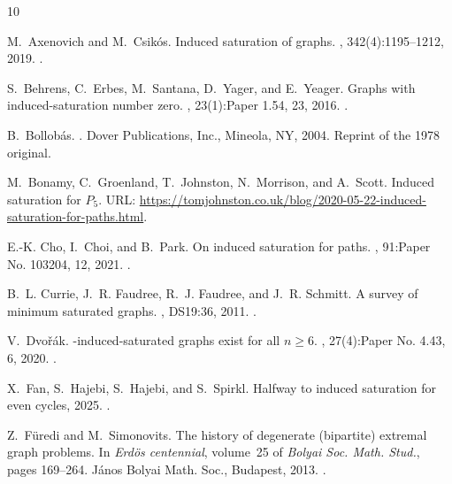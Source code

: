 \documentclass[11pt]{article}
\theoremstyle{definition}
\theoremstyle{remark}
\begin{document}
\begin{thebibliography}{10}

M.~Axenovich and M.~Csik\'os.
\newblock Induced saturation of graphs.
, 342(4):1195--1212, 2019.
\newblock \href {https://doi.org/10.1016/j.disc.2019.01.006}
  {}.

S.~Behrens, C.~Erbes, M.~Santana, D.~Yager, and E.~Yeager.
\newblock Graphs with induced-saturation number zero.
, 23(1):Paper 1.54, 23, 2016.
\newblock \href {https://doi.org/10.37236/5095} {}.

B.~Bollob\'as.
.
\newblock Dover Publications, Inc., Mineola, NY, 2004.
\newblock Reprint of the 1978 original.

M.~Bonamy, C.~Groenland, T.~Johnston, N.~Morrison, and A.~Scott.
\newblock Induced saturation for {$P_5$}.
\newblock URL:
  \url{https://tomjohnston.co.uk/blog/2020-05-22-induced-saturation-for-paths.html}.

E.-K. Cho, I.~Choi, and B.~Park.
\newblock On induced saturation for paths.
, 91:Paper No. 103204, 12, 2021.
\newblock \href {https://doi.org/10.1016/j.ejc.2020.103204}
  {}.

B.~L. Currie, J.~R. Faudree, R.~J. Faudree, and J.~R. Schmitt.
\newblock A survey of minimum saturated graphs.
, DS19:36, 2011.
\newblock \href {https://doi.org/10.37236/41} {}.

V.~Dvo\v{r}\'{a}k.
-induced-saturated graphs exist for all {$n \geqslant 6$}.
, 27(4):Paper No. 4.43, 6, 2020.
\newblock \href {https://doi.org/10.37236/9579} {}.

X.~Fan, S.~Hajebi, S.~Hajebi, and S.~Spirkl.
\newblock Halfway to induced saturation for even cycles, 2025.
\newblock \href {https://arxiv.org/abs/2505.24100} {}.

Z.~F\"uredi and M.~Simonovits.
\newblock The history of degenerate (bipartite) extremal graph problems.
\newblock In {\em Erd\"os centennial}, volume~25 of {\em Bolyai Soc. Math.
  Stud.}, pages 169--264. J\'anos Bolyai Math. Soc., Budapest, 2013.
\newblock \href {https://doi.org/10.1007/978-3-642-39286-3\_7}
  {}.


\end{thebibliography}
\end{document}
